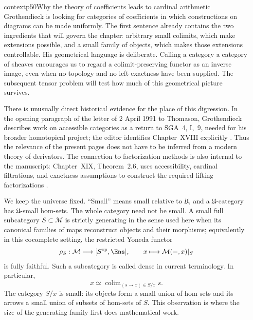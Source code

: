 
\begin{dcomment}{context}{p50}{Why the theory of coefficients leads to cardinal arithmetic}
Grothendieck is looking for categories of coefficients in which constructions on diagrams can be made uniformly. The first sentence already contains the two ingredients that will govern the chapter: arbitrary small colimits, which make extensions possible, and a small family of objects, which makes those extensions controllable. His geometrical language is deliberate. Calling a category a category of sheaves encourages us to regard a colimit-preserving functor as an inverse image, even when no topology and no left exactness have been supplied. The subsequent tensor problem will test how much of this geometrical picture survives.

There is unusually direct historical evidence for the place of this digression. In the opening paragraph of the letter of 2 April 1991 to Thomason, Grothendieck describes work on accessible categories as a return to SGA~4, I,~9, needed for his broader homotopical project; the editor identifies Chapter~XVIII explicitly \citep[opening paragraph, printed p.~2]{Grothendieck1991Letter}. Thus the relevance of the present pages does not have to be inferred from a modern theory of derivators. The connection to factorization methods is also internal to the manuscript: Chapter~XIX, Theorem~2.6, uses accessibility, cardinal filtrations, and exactness assumptions to construct the required lifting factorizations \citep[ms. pp.~25--26]{Grothendieck1990XIX}.

We keep the universe fixed. ``Small'' means small relative to $\mathfrak U$, and a $\mathfrak U$-category has $\mathfrak U$-small hom-sets. The whole category need not be small. A small full subcategory $S\subset\mathcal M$ is strictly generating in the sense used here when its canonical families of maps reconstruct objects and their morphisms; equivalently in this cocomplete setting, the restricted Yoneda functor
\[
 \rho_S:\mathcal M\longrightarrow [S^{\mathrm{op}},\Ens],
 \qquad x\longmapsto\mathcal M(-,x)|_S
\]
is fully faithful. Such a subcategory is called dense in current terminology. In particular,
\[
 x\simeq\mathop{\mathrm{colim}}_{(s\to x)\in S/x}s.
\]
The category $S/x$ is small: its objects form a small union of hom-sets and its arrows a small union of subsets of hom-sets of $S$. This observation is where the size of the generating family first does mathematical work.


\end{dcomment}
